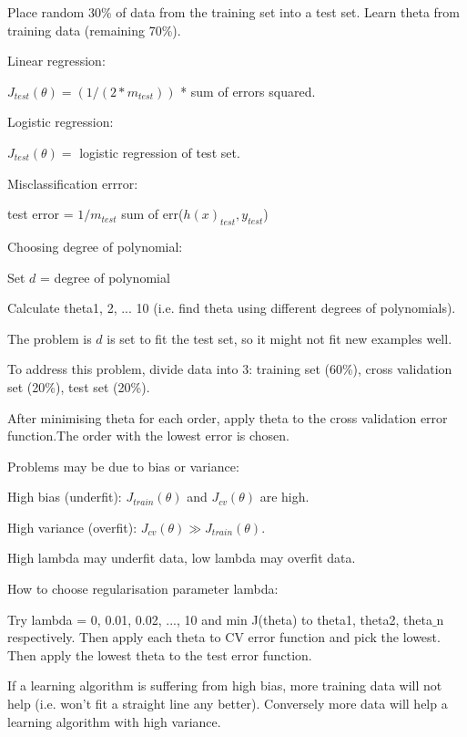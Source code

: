 \documentclass[12pt, a4paper]{article}
\begin{document}
{    Place random 30\% of data from the training set into a test set.
    Learn theta from training data (remaining 70\%).

    Linear regression:
    
    $J_{test}(\theta) = (1/(2 * m_{test}))$ * sum of errors squared.
    
    Logistic regression:
    
    $J_{test}(\theta) =$ logistic regression of test set.
    
    Misclassification errror: 
    

    test error = $1/m_{test}$ sum of err($h(x)_{test}, y_{test}$)

    Choosing degree of polynomial: 
    
    Set $d$ = degree of polynomial

    Calculate theta1, 2, ... 10 (i.e. find theta using different degrees of 
    polynomials).

    The problem is $d$ is set to fit the test set, so it might not fit new 
    examples well.

    To address this problem, divide data into 3: training set (60\%), 
    cross validation set (20\%), test set (20\%). 

    After minimising theta for each order, apply theta to the cross validation
     error function.The order with the lowest error is chosen. 

    Problems may be due to bias or variance:

    High bias (underfit): $J_{train}(\theta)$ and $J_{cv}(\theta)$ are high.

    High variance (overfit): $J_{cv}(\theta) \gg J_{train}(\theta)$.
    
    High lambda may underfit data, low lambda may overfit data. 
    
    How to choose regularisation parameter lambda:
    
    Try lambda = 0, 0.01, 0.02, ..., 10 and min J(theta) to theta1, theta2, 
    theta$\_$n respectively. Then apply each theta to CV error function and pick 
    the lowest. Then apply the lowest theta to the test error function. 

    If a learning algorithm is suffering from high bias, more training data will
    not help (i.e. won't fit a straight line any better). Conversely more data
    will help a learning algorithm with high variance. 

}
\end{document}
